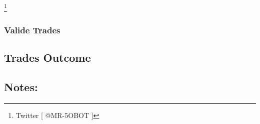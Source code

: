 \documentclass{article}
\begin{document}
\footnote{Twitter [ @MR-5OBOT ]}
\newpage
\subsubsection{Valide Trades}

\subsection{Trades Outcome}
\newpage
\subsection{Notes:}
\end{document}
